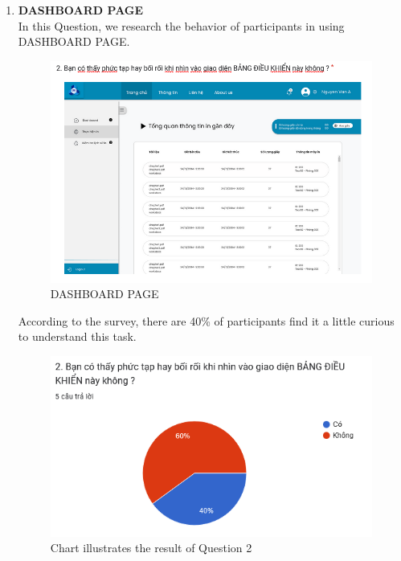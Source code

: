 \documentclass[a4paper]{report}
\begin{document}
\begin{enumerate}
    \item \textbf{DASHBOARD PAGE} \\
    In this Question, we research the behavior of participants in using DASHBOARD PAGE.
\begin{figure}[!h]
    \centering
    \includegraphics[width=0.8\linewidth]{images/image_uasbility/Q2_Stu.png}
    \caption{DASHBOARD PAGE}
    \label{fig:DASHBOARD}
\end{figure}
\newpage
According to the survey, there are 40\% of participants find it a little curious to understand this task.
\begin{figure}[!h]
    \centering
    \includegraphics[width=0.8\linewidth]{images/image_uasbility/A2_Stu.png}
    \caption{Chart illustrates the result of Question 2}
    \label{fig:Chart illustrates the result of Question 2}
\end{figure}


\end{enumerate}
\end{document}
